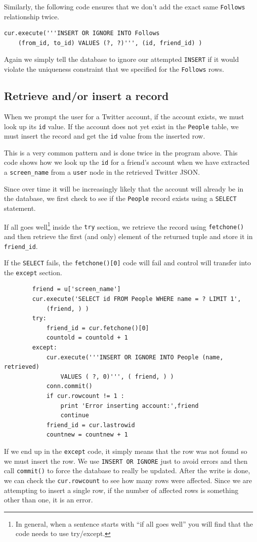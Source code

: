 \documentclass[11pt]{book}
\begin{document}
Similarly, the following code ensures that we don't add the 
exact same {\tt Follows} relationship twice.

\beforeverb
\begin{verbatim}
cur.execute('''INSERT OR IGNORE INTO Follows 
    (from_id, to_id) VALUES (?, ?)''', (id, friend_id) )
\end{verbatim}
\afterverb
%
Again we simply tell the database to ignore our attempted 
{\tt INSERT} if it would violate the uniqueness constraint
that we specified for the {\tt Follows} rows.

\subsection{Retrieve and/or insert a record}

When we prompt the user for a Twitter account, if the account 
exists, we must look up its {\tt id} value.  If the account
does not yet exist in the {\tt People} table, we must insert 
the record and get the {\tt id} value from the inserted
row.

This is a very common pattern and is done twice in the program above.
This code shows how we look up the {\tt id} for a 
friend's account when we have extracted a \verb"screen_name"
from a {\tt user} node in the retrieved Twitter JSON.

Since over time it will be increasingly likely that the account
will already be in the database, we first check to see if the
{\tt People} record exists using a {\tt SELECT} statement.

If all goes well\footnote{In general, when a sentence starts 
with ``if all goes well'' you will find that the code needs
to use try/except.} inside the {\tt try} section, we retrieve the
record using {\tt fetchone()} and then retrieve the
first (and only) element of the returned tuple and store it in 
\verb"friend_id".

If the {\tt SELECT} fails, the {\tt fetchone()[0]} code will fail
and control will transfer into the {\tt except} section.

\beforeverb
\begin{verbatim}
        friend = u['screen_name']
        cur.execute('SELECT id FROM People WHERE name = ? LIMIT 1',
            (friend, ) )
        try:
            friend_id = cur.fetchone()[0]
            countold = countold + 1
        except:
            cur.execute('''INSERT OR IGNORE INTO People (name, retrieved) 
                VALUES ( ?, 0)''', ( friend, ) )
            conn.commit()
            if cur.rowcount != 1 :
                print 'Error inserting account:',friend
                continue
            friend_id = cur.lastrowid
            countnew = countnew + 1
\end{verbatim}
\afterverb
%
If we end up in the {\tt except} code, it simply means that the row
was not found so we must insert the row.  We use {\tt INSERT OR 
IGNORE} just to avoid errors and then call {\tt commit()} to 
force the database to really be updated.  After the write is done, we can 
check the {\tt cur.rowcount} to see how many rows were affected.  Since
we are attempting to insert a single row, if the number of 
affected rows is something other than one, it is an error.  
\end{document}
